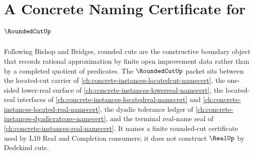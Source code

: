 \chapter{A Concrete Naming Certificate for $\RoundedCutUp$}
\label{ch:concrete-instances-rounded-cut-namecert}

Following Bishop and Bridges, rounded cuts are the constructive boundary object that records rational approximation by finite open improvement data rather than by a completed quotient of predicates. The $\RoundedCutUp$ packet sits between the located-cut carrier of \autoref{ch:concrete-instances-locatedcut-namecert}, the one-sided lower-real surface of \autoref{ch:concrete-instances-lowerreal-namecert}, the located-real interfaces of \autoref{ch:concrete-instances-locatedreal-namecert} and \autoref{ch:concrete-instances-located-real-namecert}, the dyadic tolerance ledger of \autoref{ch:concrete-instances-dyadicratcore-namecert}, and the terminal real-name seal of \autoref{ch:concrete-instances-real-namecert}. It names a finite rounded-cut certificate used by L10 Real and Completion consumers; it does not construct $\RealUp$ by Dedekind cuts.


